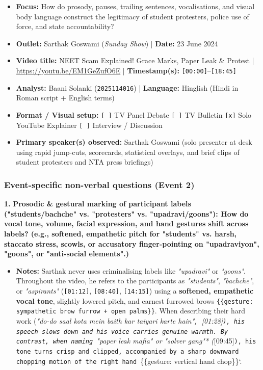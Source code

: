 \documentclass[10pt,a4paper]{article}
\begin{document}
\begin{itemize}
  \item \textbf{Focus:} How do prosody, pauses, trailing sentences, vocalisations, and visual body language construct the legitimacy of student protesters, police use of force, and state accountability?
  \item \textbf{Outlet:} Sarthak Goswami (\textit{Sunday Show}) | \textbf{Date:} 23 June 2024
  \item \textbf{Video title:} NEET Scam Explained! Grace Marks, Paper Leak \& Protest | \href{https://youtu.be/EM1GeZufO6E}{https://youtu.be/EM1GeZufO6E} | \textbf{Timestamp(s):} \texttt{[00:00]}--\texttt{[18:45]}
  \item \textbf{Analyst:} Baani Solanki (\texttt{2025114016}) | \textbf{Language:} Hinglish (Hindi in Roman script + English terms)
  \item \textbf{Format / Visual setup:} \texttt{[ ]} TV Panel Debate \texttt{[ ]} TV Bulletin \texttt{[x]} Solo YouTube Explainer \texttt{[ ]} Interview / Discussion
  \item \textbf{Primary speaker(s) observed:} Sarthak Goswami (solo presenter at desk using rapid jump-cuts, scorecards, statistical overlays, and brief clips of student protesters and NTA press briefings)
\end{itemize}

\subsubsection*{Event-specific non-verbal questions (Event 2)}

\noindent\textbf{1.} \textbf{Prosodic \& gestural marking of participant labels ("students/bachche" vs. "protesters" vs. "upadravi/goons"): How do vocal tone, volume, facial expression, and hand gestures shift across labels? (e.g., softened, empathetic pitch for "students" vs. harsh, staccato stress, scowls, or accusatory finger-pointing on "upadraviyon", "goons", or "anti-social elements".)}\par\smallskip
\begin{itemize}
  \item \textbf{Notes:}
Sarthak never uses criminalising labels like \textit{"upadravi"} or \textit{"goons"}. Throughout the video, he refers to the participants as \textit{"students"}, \textit{"bachche"}, or \textit{"aspirants"} (\texttt{[01:12]}, \texttt{[08:40]}, \texttt{[14:15]}) using a \textbf{softened, empathetic vocal tone}, slightly lowered pitch, and earnest furrowed brows \texttt{\{\{gesture: sympathetic brow furrow + open palms\}\}}. When describing their hard work (\textit{"do-do saal kota mein baith kar taiyari karte hain"\texttt{, }[01:28]\texttt{), his speech slows down and his voice carries genuine warmth. By contrast, when naming }"paper leak mafia"\textit{ or }"solver gang"* (}[09:45]\texttt{), his tone turns crisp and clipped, accompanied by a sharp downward chopping motion of the right hand }\{\{gesture: vertical hand chop\}\}`.\par\smallskip
\end{itemize}
\end{document}
